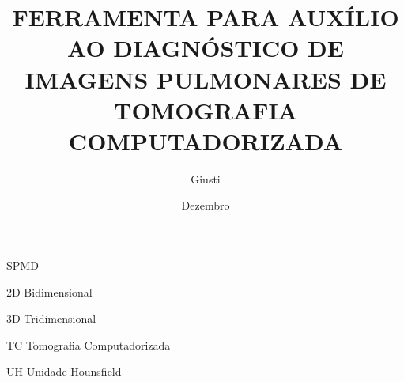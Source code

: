 \documentclass[tc]{texufpel}
\author{Giusti}{Filipe Vernetti}
\title{FERRAMENTA PARA AUXÍLIO AO DIAGNÓSTICO DE IMAGENS PULMONARES DE TOMOGRAFIA COMPUTADORIZADA}
\date{Dezembro}{2008}
\begin{document}
\maketitle

\makeexaminers




\listoffigures
\listoftables

\begin{listofabbrv}{SPMD}
	\item[2D] Bidimensional
	\item[3D] Tridimensional
	\item[TC] Tomografia Computadorizada
	\item[UH] Unidade Hounsfield
\end{listofabbrv}


\tableofcontents










\end{document}
